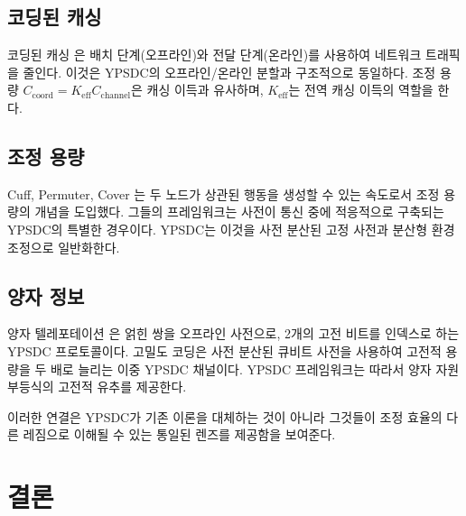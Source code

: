 \documentclass[12pt,a4paper]{article}
\begin{document}
	\subsection*{코딩된 캐싱}
	코딩된 캐싱 \cite{MaddahAli2014}은 배치 단계(오프라인)와 전달 단계(온라인)를 사용하여 네트워크 트래픽을 줄인다. 이것은 YPSDC의 오프라인/온라인 분할과 구조적으로 동일하다. 조정 용량 $C_{\mathrm{coord}} = K_{\mathrm{eff}} C_{\mathrm{channel}}$은 캐싱 이득과 유사하며, $K_{\mathrm{eff}}$는 전역 캐싱 이득의 역할을 한다.
	
	\subsection*{조정 용량}
	Cuff, Permuter, Cover \cite{Cuff2013}는 두 노드가 상관된 행동을 생성할 수 있는 속도로서 조정 용량의 개념을 도입했다. 그들의 프레임워크는 사전이 통신 중에 적응적으로 구축되는 YPSDC의 특별한 경우이다. YPSDC는 이것을 사전 분산된 고정 사전과 분산형 환경 조정으로 일반화한다.
	
	\subsection*{양자 정보}
	양자 텔레포테이션 \cite{Bennett1993}은 얽힌 쌍을 오프라인 사전으로, 2개의 고전 비트를 인덱스로 하는 YPSDC 프로토콜이다. 고밀도 코딩은 사전 분산된 큐비트 사전을 사용하여 고전적 용량을 두 배로 늘리는 이중 YPSDC 채널이다. YPSDC 프레임워크는 따라서 양자 자원 부등식의 고전적 유추를 제공한다.
	
	이러한 연결은 YPSDC가 기존 이론을 대체하는 것이 아니라 그것들이 조정 효율의 다른 레짐으로 이해될 수 있는 통일된 렌즈를 제공함을 보여준다.
	
	\clearpage
	\section{결론}
	
\end{document}
